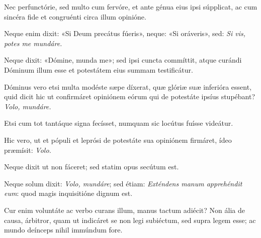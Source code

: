 {\noindent Nec perfunctórie, sed multo cum fervóre, et ante génua eius ipsi súpplicat, ac cum sincéra fide et congruénti circa illum opinióne.

\noindent Neque enim dixit: «Si Deum precátus fúeris», neque: «Si oráveris», sed: \emph{Si vis, potes me mundáre.} 

\noindent Neque dixit: «Dómine, munda me»; sed ipsi cuncta commíttit, atque curándi Dóminum illum esse et potestátem eius summam testificátur. 

\noindent Dóminus vero etsi multa modéste sæpe díxerat, quæ glóriæ suæ inferióra essent, quid dicit hic ut confirmáret opiniónem eórum qui de potestáte ipsíus stupébant? \emph{Volo, mundáre.} 

\noindent Etsi cum tot tantáque signa fecísset, numquam sic locútus fuísse videátur.

\noindent Hic vero, ut et pópuli et leprósi de potestáte sua opiniónem firmáret, ídeo præmísit: \emph{Volo.} 

\noindent Neque dixit ut non fáceret; sed statim opus secútum est. 

\noindent Neque solum dixit: \emph{Volo, mundáre}; sed étiam: \emph{Exténdens manum apprehéndit eum}: quod magis inquisitióne dignum est. 

\noindent Cur enim voluntáte ac verbo curans illum, manus tactum adiécit? Non ália de causa, árbitror, quam ut indicáret se non legi subiéctum, sed supra legem esse; ac mundo deínceps nihil immúndum fore.


\vfill
\pagebreak

 

\vspace{-5mm}


\vfill
\pagebreak
}
\newcommand{\hymnuslaudes}{\pars{Hymnus} \scriptura{Alcuinus (\olddag{} 804)}

\cuminitiali{IV}{temporalia/hym-EcceIam.gtex}}
